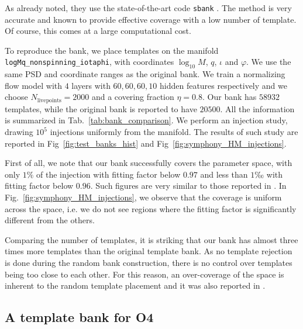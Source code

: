 \documentclass[twocolumn,showpacs,preprintnumbers,nofootinbib,prd,
superscriptaddress,10pt]{revtex4-2}
\begin{document}
As already noted, they use the state-of-the-art code \texttt{sbank} \cite{Ajith:2012mn, PhysRevD.80.104014}.
The method is very accurate and known to provide effective coverage with a low number of template. Of course, this comes at a large computational cost.

To reproduce the bank, we place templates on the manifold \texttt{logMq\_nonspinning\_iotaphi}, with coordinates $\log_{10}M$, $q$, $\iota$ and $\varphi$. We use the same PSD and coordinate ranges as the original bank.
We train a normalizing flow model with $4$ layers with $60, 60, 60, 10$ hidden features respectively and we choose $N_\text{livepoints} = 2000$ and a covering fraction $\eta = 0.8$.
Our bank has $58932$ templates, while the original bank is reported to have $20500$.
All the information is summarized in Tab.~\ref{tab:bank_comparison}.
We perform an injection study, drawing $10^5$ injections uniformly from the manifold. The results of such study are reported in Fig~\ref{fig:test_banks_hist} and Fig~\ref{fig:symphony_HM_injections}.

First of all, we note that our bank successfully covers the parameter space, with only $1\%$ of the injection with fitting factor below $0.97$ and less than $1$‰ with fitting factor below $0.96$. Such figures are very similar to those reported in \cite{Harry:2017weg}.
In Fig.~\ref{fig:symphony_HM_injections}, we observe that the coverage is uniform across the space, i.e. we do not see regions where the fitting factor is significantly different from the others.

Comparing the number of templates, it is striking that our bank has almost three times more templates than the original template bank.
As no template rejection is done during the random bank construction, there is no control over templates being too close to each other. For this reason, an over-coverage of the space is inherent to the random template placement and it was also reported in \cite{Messenger:2008ta,Coogan:2022qxs}.

\subsection{A template bank for O4} \label{sec:all_sky_comparison}
\end{document}
